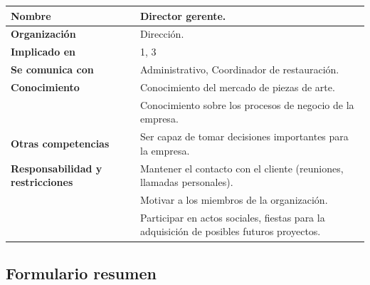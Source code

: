 \documentclass[a4paper,11pt]{article}
\begin{document}
			\begin{center}
				\begin{tabular}{| l | p{5.5cm} |}
					\hline
					\cellcolor[RGB]{224,233,250}\textbf{Nombre} & Director gerente.\\
					\hline
					\cellcolor[RGB]{224,233,250}\textbf{Organización} & Dirección.\\
					\hline
					\cellcolor[RGB]{224,233,250}\textbf{Implicado en} & 1, 3\\
					\hline
					\cellcolor[RGB]{224,233,250}\textbf{Se comunica con} & Administrativo,
					Coordinador de restauración.\\
					\hline
					\cellcolor[RGB]{224,233,250}\textbf{Conocimiento} & Conocimiento del
					mercado de piezas de arte.\\
					\cellcolor[RGB]{224,233,250}& Conocimiento sobre los procesos de negocio de
					la empresa.\\
					\hline
					\cellcolor[RGB]{224,233,250}\textbf{Otras competencias} & Ser capaz de
					tomar decisiones importantes para la empresa.\\
					\hline
					\cellcolor[RGB]{224,233,250}\textbf{Responsabilidad y restricciones} &
					Mantener el contacto con el cliente (reuniones, llamadas personales).\\
					\cellcolor[RGB]{224,233,250}& Motivar a los miembros de la organización.\\
					\cellcolor[RGB]{224,233,250}& Participar en actos sociales, fiestas para la
					adquisición de posibles futuros proyectos.\\
					\hline
				\end{tabular}
			\end{center}
		\newpage
		\subsection{Formulario resumen}
\end{document}
